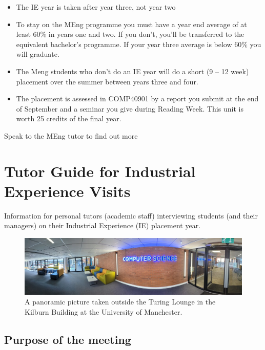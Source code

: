 \documentclass[
]{book}
\providecommand{\tightlist}{%
  \setlength{\itemsep}{0pt}\setlength{\parskip}{0pt}}
\begin{document}
\begin{itemize}
\tightlist
\item
  The IE year is taken after year three, not year two
\item
  To stay on the MEng programme you must have a year end average of at least 60\% in years one and two. If you don't, you'll be transferred to the equivalent bachelor's programme. If your year three average is below 60\% you will graduate.
\item
  The Meng students who don't do an IE year will do a short (9 -- 12 week) placement over the summer between years three and four.
\item
  The placement is assessed in COMP40901 by a report you submit at the end of September and a seminar you give during Reading Week. This unit is worth 25 credits of the final year.
\end{itemize}

Speak to the MEng tutor to find out more

\chapter{Tutor Guide for Industrial Experience Visits}\label{tutors}

Information for personal tutors (academic staff) interviewing students (and their managers) on their Industrial Experience (IE) placement year.

\begin{figure}

{\centering \includegraphics[width=1\linewidth]{images/computerscience} 

}

\caption{A panoramic picture taken outside the Turing Lounge in the Kilburn Building at the University of Manchester.}\label{fig:computerscience-fig}
\end{figure}



\section{Purpose of the meeting}\label{purpose}
\end{document}
